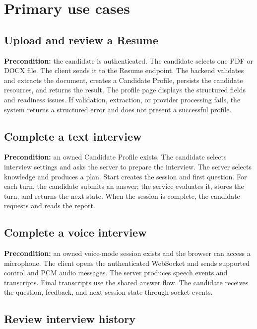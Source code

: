 \section{Primary use cases}

\subsection{Upload and review a Resume}

\textbf{Precondition:} the candidate is authenticated. The candidate selects one PDF or DOCX file. The client sends it to the Resume endpoint. The backend validates and extracts the document, creates a Candidate Profile, persists the candidate resources, and returns the result. The profile page displays the structured fields and readiness issues. If validation, extraction, or provider processing fails, the system returns a structured error and does not present a successful profile.

\subsection{Complete a text interview}

\textbf{Precondition:} an owned Candidate Profile exists. The candidate selects interview settings and asks the server to prepare the interview. The server selects knowledge and produces a plan. Start creates the session and first question. For each turn, the candidate submits an answer; the service evaluates it, stores the turn, and returns the next state. When the session is complete, the candidate requests and reads the report.

\subsection{Complete a voice interview}

\textbf{Precondition:} an owned voice-mode session exists and the browser can access a microphone. The client opens the authenticated WebSocket and sends supported control and PCM audio messages. The server produces speech events and transcripts. Final transcripts use the shared answer flow. The candidate receives the question, feedback, and next session state through socket events.

\subsection{Review interview history}

